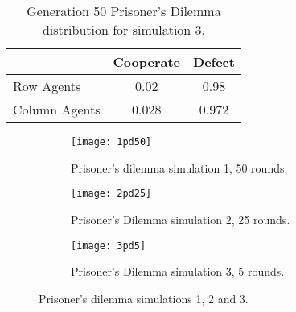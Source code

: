\begin{table}[H]
\begin{center}
\begin{tabular}{|l|c|c|}
\hline
& Cooperate & Defect \\ 
\hline
Row Agents & 0.02 & 0.98\\
\hline
Column Agents & 0.028 & 0.972\\
\hline
\end{tabular}
\end{center}
\caption{Generation 50 Prisoner’s Dilemma distribution for simulation 3.}
\label{tab:pds3g50}
 \end{table}

\begin{figure}[H]       
    \centering
    \begin{subfigure}[b]{0.3\textwidth}
	\centering
	{\texttt{[image: 1pd50]}}
	\caption{ Prisoner's dilemma simulation 1, 50 rounds.}
	\label{fig:pds1}
    \end{subfigure}
    \hfill
    \begin{subfigure}[b]{0.3\textwidth}
	\centering
	{\texttt{[image: 2pd25]}}
	\caption{ Prisoner's Dilemma simulation 2, 25 rounds.}
	\label{fig:pds2}
    \end{subfigure}
    \hfill
    \begin{subfigure}[b]{0.3\textwidth}
	\centering
	{\texttt{[image: 3pd5]}}
	\caption{Prisoner's Dilemma simulation 3, 5 rounds.}
	\label{fig:pds3}
    \end{subfigure}
    \caption{Prisoner's dilemma simulations 1, 2 and 3.}
    \label{pdsim345r5}
\end{figure}


